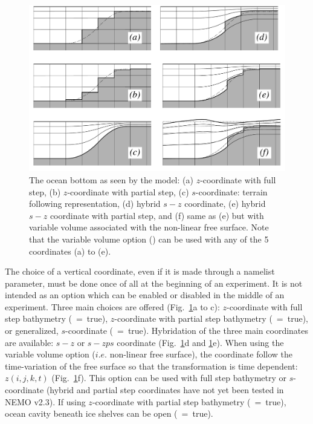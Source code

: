 {%
\begin{figure}[!tb]    \begin{center}
\includegraphics[width=1.0\textwidth]{./TexFiles/Figures/Fig_z_zps_s_sps.pdf}
\caption{  \label{Fig_z_zps_s_sps}   
The ocean bottom as seen by the model: 
(a) $z$-coordinate with full step, 
(b) $z$-coordinate with partial step, 
(c) $s$-coordinate: terrain following representation, 
(d) hybrid $s-z$ coordinate, 
(e) hybrid $s-z$ coordinate with partial step, and 
(f) same as (e) but with variable volume associated with the non-linear free surface. 
Note that the variable volume option () can be used with any of the 
5 coordinates (a) to (e).}
\end{center}   \end{figure}

The choice of a vertical coordinate, even if it is made through a namelist parameter, 
must be done once of all at the beginning of an experiment. It is not intended as an 
option which can be enabled or disabled in the middle of an experiment. Three main 
choices are offered (Fig.~\ref{Fig_z_zps_s_sps}a to c): $z$-coordinate with full step 
bathymetry (~=~true), $z$-coordinate with partial step bathymetry 
(~=~true), or generalized, $s$-coordinate (~=~true). 
Hybridation of the three main coordinates are available: $s-z$ or $s-zps$ coordinate 
(Fig.~\ref{Fig_z_zps_s_sps}d and \ref{Fig_z_zps_s_sps}e). When using the variable 
volume option  ($i.e.$ non-linear free surface), the coordinate follow the 
time-variation of the free surface so that the transformation is time dependent: 
$z(i,j,k,t)$ (Fig.~\ref{Fig_z_zps_s_sps}f). This option can be used with full step 
bathymetry or $s$-coordinate (hybrid and partial step coordinates have not 
yet been tested in NEMO v2.3). If using $z$-coordinate with partial step bathymetry
(~=~true), ocean cavity beneath ice shelves can be open (~=~true).

}

